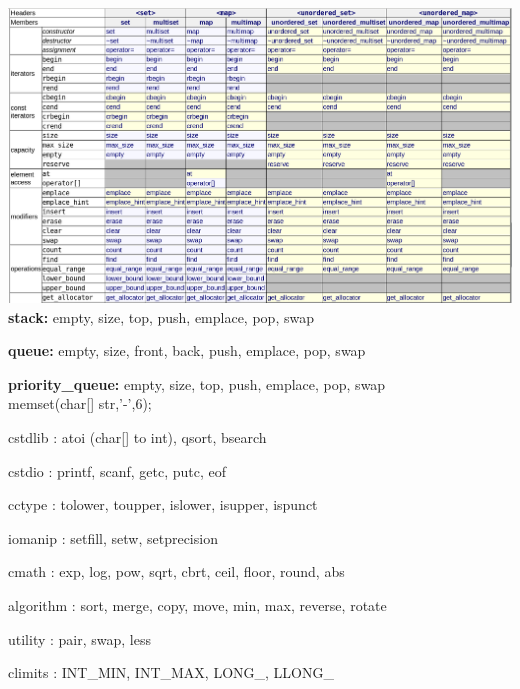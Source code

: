 \documentclass[table]{article}
\begin{document}
\vspace*{-1cm}
\hspace*{-2.5cm}\includegraphics[width=0.95\paperwidth]{3.png}\\

\textbf{stack:} empty, size, top, push, emplace, pop, swap

\textbf{queue:} empty, size, front, back, push, emplace, pop, swap

\textbf{priority\_queue:} empty, size, top, push, emplace, pop, swap\\

memset(char[] str,'-',6);

cstdlib : atoi (char[] to int), qsort, bsearch

cstdio : printf, scanf, getc, putc, eof

cctype : tolower, toupper, islower, isupper, ispunct

iomanip : setfill, setw, setprecision

cmath : exp, log, pow, sqrt, cbrt, ceil, floor, round, abs

algorithm : sort, merge, copy, move, min, max, reverse, rotate

utility : pair, swap, less

climits : INT\_MIN, INT\_MAX, LONG\_, LLONG\_
	
\end{document}
